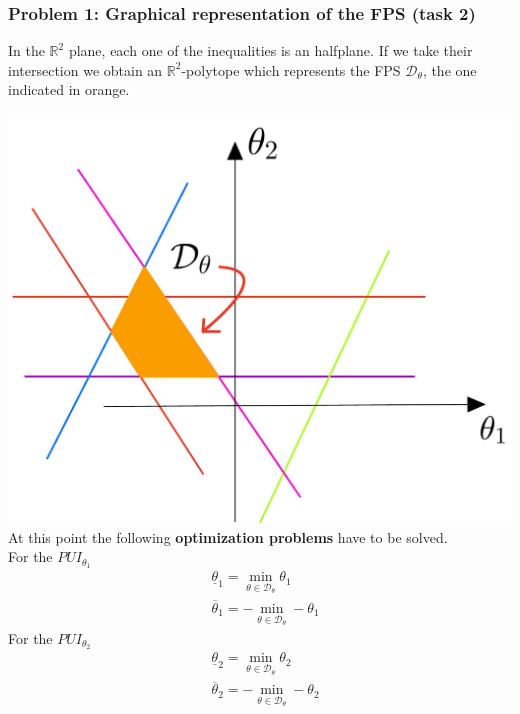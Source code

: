\documentclass{beamer}
\begin{document}
\begin{frame}
    \frametitle{Problem 1: Graphical representation of the FPS (task 2)}
    In the $\mathbb{R}^2$ plane, each one of the inequalities is an halfplane. If we take their intersection we obtain an $\mathbb{R}^2$-polytope which represents the FPS $\mathcal{D}_\theta$, the one indicated in {\color{orange} orange}.

    \begin{multicols}{2}
        \includegraphics[scale=0.12]{img/polytope.jpeg}\\
        \newcolumn
        At this point the following \textbf{optimization problems} have to be solved. \\\alert{For the $PUI_{\theta_1}$}
        \vspace{-0.3cm}
        \begin{align}
            &\underline{\theta}_1  = \min_{\theta\in\mathcal{D}_\theta} \theta_1 \\
            &\overline{\theta}_1 = -\min_{\theta\in\mathcal{D}_\theta} -\theta_1 
        \end{align}
        \vspace{-0.3cm}
        \alert{For the $PUI_{\theta_2}$}
        \begin{align}
            &\underline{\theta}_2  = \min_{\theta\in\mathcal{D}_\theta} \theta_2 \\
            &\overline{\theta}_2 = -\min_{\theta\in\mathcal{D}_\theta} -\theta_2
        \end{align}
    \end{multicols}
\end{frame}
\end{document}

